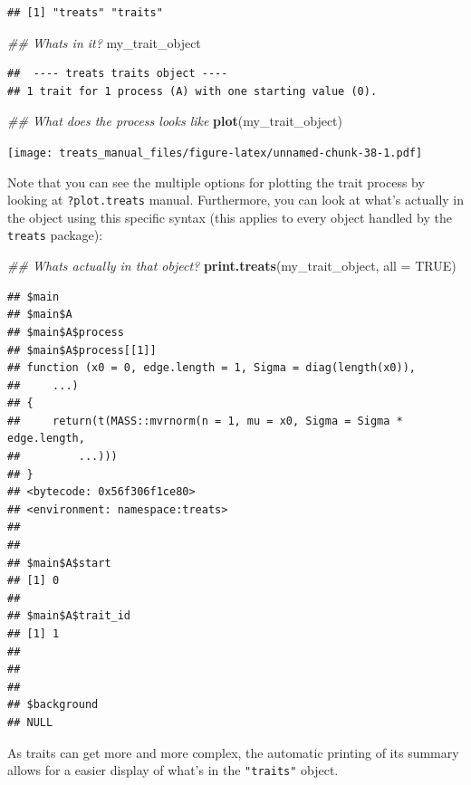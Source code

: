 \documentclass[
]{book}
\newenvironment{Shaded}{\begin{snugshade}}{\end{snugshade}}
\newcommand{\CommentTok}[1]{\textcolor[rgb]{0.56,0.35,0.01}{\textit{#1}}}
\newcommand{\DataTypeTok}[1]{\textcolor[rgb]{0.13,0.29,0.53}{#1}}
\newcommand{\KeywordTok}[1]{\textcolor[rgb]{0.13,0.29,0.53}{\textbf{#1}}}
\newcommand{\NormalTok}[1]{#1}
\newcommand{\OtherTok}[1]{\textcolor[rgb]{0.56,0.35,0.01}{#1}}
\begin{document}
\begin{verbatim}
## [1] "treats" "traits"
\end{verbatim}

\begin{Shaded}
\begin{Highlighting}[]
\CommentTok{\#\# What\textquotesingle{}s in it?}
\NormalTok{my\_trait\_object}
\end{Highlighting}
\end{Shaded}

\begin{verbatim}
##  ---- treats traits object ---- 
## 1 trait for 1 process (A) with one starting value (0).
\end{verbatim}

\begin{Shaded}
\begin{Highlighting}[]
\CommentTok{\#\# What does the process looks like}
\KeywordTok{plot}\NormalTok{(my\_trait\_object)}
\end{Highlighting}
\end{Shaded}

\texttt{[image: treats\_manual\_files/figure-latex/unnamed-chunk-38-1.pdf]}

Note that you can see the multiple options for plotting the trait process by looking at \texttt{?plot.treats} manual. Furthermore, you can look at what's actually in the object using this specific syntax (this applies to every object handled by the \texttt{treats} package):

\begin{Shaded}
\begin{Highlighting}[]
\CommentTok{\#\# What\textquotesingle{}s actually in that object?}
\KeywordTok{print.treats}\NormalTok{(my\_trait\_object, }\DataTypeTok{all =} \OtherTok{TRUE}\NormalTok{)}
\end{Highlighting}
\end{Shaded}

\begin{verbatim}
## $main
## $main$A
## $main$A$process
## $main$A$process[[1]]
## function (x0 = 0, edge.length = 1, Sigma = diag(length(x0)), 
##     ...) 
## {
##     return(t(MASS::mvrnorm(n = 1, mu = x0, Sigma = Sigma * edge.length, 
##         ...)))
## }
## <bytecode: 0x56f306f1ce80>
## <environment: namespace:treats>
## 
## 
## $main$A$start
## [1] 0
## 
## $main$A$trait_id
## [1] 1
## 
## 
## 
## $background
## NULL
\end{verbatim}

As traits can get more and more complex, the automatic printing of its summary allows for a easier display of what's in the \texttt{"traits"} object.
\end{document}
